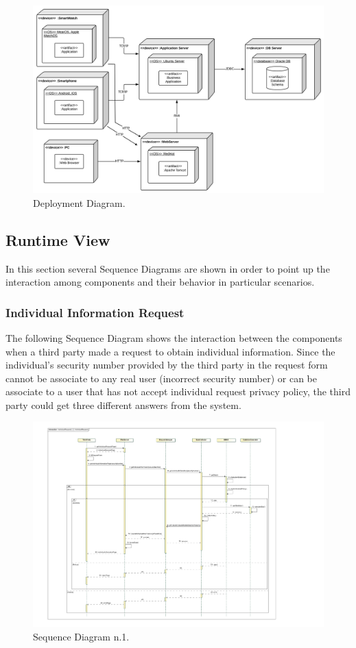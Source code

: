 \begin{figure}[H]
\centering
\includegraphics[scale=0.12]{Images/DeploymentDiagram.png}
\caption{Deployment Diagram.}
\end{figure}

\subsection{Runtime View}
In this section several Sequence Diagrams are shown in order to point up the interaction among components and their behavior in particular scenarios.
\newpage
\subsubsection{Individual Information Request}
The following Sequence Diagram shows the interaction between the components when a third party made a request to obtain individual information. Since the individual's security number provided by the third party in the request form cannot be associate to any real user (incorrect security number) or can be associate to a user that has not accept individual request privacy policy, the third party could get three different answers from the system.
\\[1.0cm]
\begin{figure}[H]
\centering
\includegraphics[scale=0.8, angle=0,origin=c]{Images/SequenceDiagrams/IndividualRequest.pdf}
\caption{Sequence Diagram n.1.}
\clearpage
\end{figure}
\newpage
